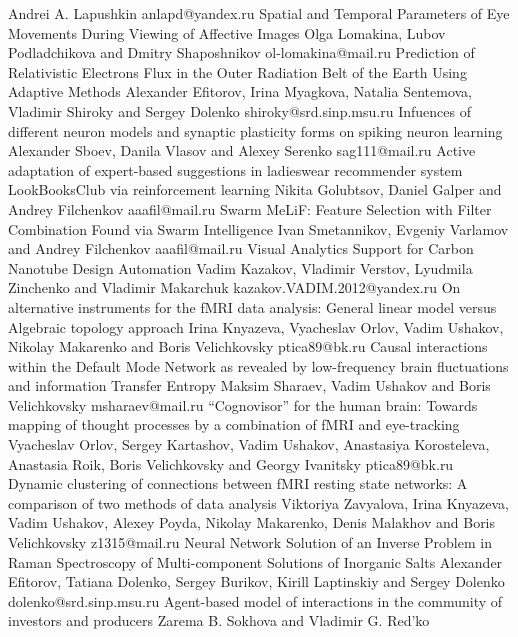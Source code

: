 \documentclass[10pt,fleqn,openany]{book} %
\begin{document}
\begin{enumerate}
		{Andrei A. Lapushkin}
		{anlapd@yandex.ru}
	\poster
		{Spatial and Temporal Parameters of Eye Movements During Viewing of Affective Images}
		{Olga Lomakina, Lubov Podladchikova and Dmitry Shaposhnikov}
		{ol-lomakina@mail.ru}
	\poster
		{Prediction of Relativistic Electrons Flux in the Outer Radiation Belt of the Earth Using Adaptive Methods}
		{Alexander Efitorov, Irina Myagkova, Natalia Sentemova, Vladimir Shiroky and Sergey Dolenko}
		{shiroky@srd.sinp.msu.ru}
	\poster
		{Infuences of different neuron models and synaptic plasticity forms on spiking neuron learning}
		{Alexander Sboev, Danila Vlasov and Alexey Serenko}
		{sag111@mail.ru}
	\poster
		{Active adaptation of expert-based suggestions in ladieswear recommender system LookBooksClub via reinforcement learning}
		{Nikita Golubtsov, Daniel Galper and Andrey Filchenkov}
		{aaafil@mail.ru}
	\poster
		{Swarm MeLiF: Feature Selection with Filter Combination Found via Swarm Intelligence}
		{Ivan Smetannikov, Evgeniy Varlamov and Andrey Filchenkov}
		{aaafil@mail.ru}
	\poster
		{Visual Analytics Support for Carbon Nanotube Design Automation}
		{Vadim Kazakov, Vladimir Verstov, Lyudmila Zinchenko and Vladimir Makarchuk}
		{kazakov.VADIM.2012@yandex.ru}
	\poster
		{On alternative instruments for the fMRI data analysis: General linear model versus Algebraic topology approach}
		{Irina Knyazeva, Vyacheslav Orlov, Vadim Ushakov, Nikolay Makarenko and Boris Velichkovsky}
		{ptica89@bk.ru}
	\poster
		{Causal interactions within the Default Mode Network as revealed by low-frequency brain fluctuations and information Transfer Entropy}
		{Maksim Sharaev, Vadim Ushakov and Boris Velichkovsky}
		{msharaev@mail.ru}
	\poster
		{“Cognovisor” for the human brain: Towards mapping of thought processes by a combination of fMRI and eye-tracking}
		{Vyacheslav Orlov, Sergey Kartashov, Vadim Ushakov, Anastasiya Korosteleva, Anastasia Roik, Boris Velichkovsky and Georgy Ivanitsky}
		{ptica89@bk.ru}
	\poster
		{Dynamic clustering of connections between fMRI resting state networks: A comparison of two methods of data analysis}
		{Viktoriya Zavyalova, Irina Knyazeva, Vadim Ushakov, Alexey Poyda, Nikolay Makarenko, Denis Malakhov and Boris Velichkovsky}
		{z1315@mail.ru}
	\poster
		{Neural Network Solution of an Inverse Problem in Raman Spectroscopy of Multi-component Solutions of Inorganic Salts}
		{Alexander Efitorov, Tatiana Dolenko, Sergey Burikov, Kirill Laptinskiy and Sergey Dolenko}
		{dolenko@srd.sinp.msu.ru}
	\poster
		{Agent-based model of interactions in the community of investors and producers}
		{Zarema B. Sokhova and Vladimir G. Red'ko}

\end{enumerate}
\end{document}
